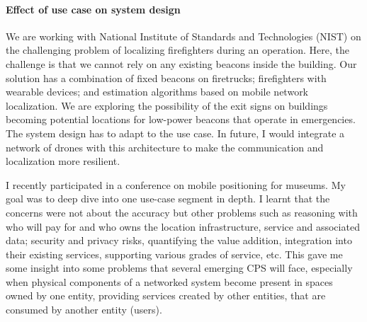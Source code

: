 \documentclass[10pt]{article}
\begin{document}
\paragraph{Effect of use case on system design} 
We are working with National Institute of Standards and Technologies (NIST) on the challenging problem of localizing firefighters during an operation. Here, the challenge is that we cannot rely on any existing beacons inside the building. Our solution has a combination of fixed beacons on firetrucks; firefighters with wearable devices; and estimation algorithms based on mobile network localization. We are exploring the possibility of the exit signs on buildings becoming potential locations for low-power beacons that operate in emergencies. The system design has to adapt to the use case. In future, I would integrate a network of drones with this architecture to make the communication and localization more resilient.%

I recently participated in a conference on mobile positioning for museums. My goal was to deep dive into one use-case segment in depth. I learnt that the concerns were not about the accuracy but other problems such as reasoning with who will pay for and who owns the location infrastructure, service and associated data; security and privacy risks, quantifying the value addition, integration into their existing services, supporting various grades of service, etc. This gave me some insight into some problems that several emerging CPS will face, especially when physical components of a networked system become present in spaces owned by one entity, providing services created by other entities, that are consumed by another entity (users). 
\end{document}
